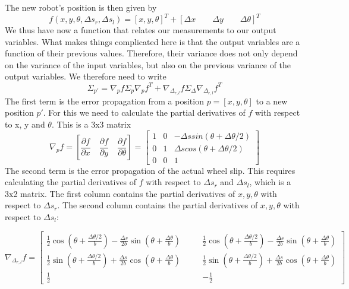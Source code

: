 The new robot's position is then given by
\begin{equation}
f(x,y,\theta,\Delta s_r, \Delta s_l)=[x,y,\theta]^T + [\Delta x \qquad \Delta y \qquad \Delta \theta]^T
\end{equation}
We thus have now a function that relates our measurements to our output variables. What makes things complicated here is that the output variables are a function of their previous values. Therefore, their variance does not only depend on the variance of the input variables, but also on the previous variance of the output variables. We therefore need to write
\begin{equation}\label{eq:errorpropodom}
\Sigma_{p'}=\nabla_p f \Sigma_p \nabla_p f^T + \nabla_{\Delta_{r,l}}f \Sigma_{\Delta}\nabla_{\Delta_{r,l}}f^T
\end{equation}
The first term is the error propagation from a position $ p=[x,y,\theta]$ to a new position $ p'$. For this we need to calculate the partial derivatives of $ f$ with respect to x, y and $ \theta$. This is a 3x3 matrix
\begin{equation}
\nabla_p f=\left[\frac{\partial f}{\partial x} \quad \frac{\partial f}{\partial y} \quad \frac{\partial f}{\partial \theta}\right]=\left[\begin{array}{ccc}1 & 0 & -\Delta s sin(\theta +\Delta \theta /2)\\0 & 1 & \Delta s cos(\theta + \Delta \theta/2)\\0 & 0 &1\end{array}\right]
\end{equation}
The second term is the error propagation of the actual wheel slip. This requires calculating the partial derivatives of $ f$ with respect to $ \Delta s_r$ and $ \Delta s_l$, which is a 3x2 matrix. The first column contains the partial derivatives of $ x,y,\theta$ with respect to $ \Delta s_r$. The second column contains the partial derivatives of $ x,y,\theta$ with respect to $ \Delta s_l$:
\begin{scriptsize}
\begin{equation}
\nabla_{\Delta_{r,l}} f=\left[
\begin{array}{ccc}
\frac{1}{2}\cos(\theta+\frac{\Delta \theta/2}{b})
-\frac{\Delta s}{2b}\sin(\theta+\frac{\Delta \theta}{b})
& \quad & \frac{1}{2}\cos(\theta+\frac{\Delta \theta/2}{b})
-\frac{\Delta s}{2b}\sin(\theta+\frac{\Delta \theta}{b})
\\
\frac{1}{2}\sin(\theta+\frac{\Delta \theta/2}{b})
+\frac{\Delta s}{2b}\cos(\theta+\frac{\Delta \theta}{b})
& \quad & \frac{1}{2}\sin(\theta+\frac{\Delta \theta/2}{b})
+\frac{\Delta s}{2b}\cos(\theta+\frac{\Delta \theta}{b})
\\
\frac{1}{2} & \quad & -\frac{1}{2}
\end{array}
\right]
\end{equation}
\end{scriptsize}

